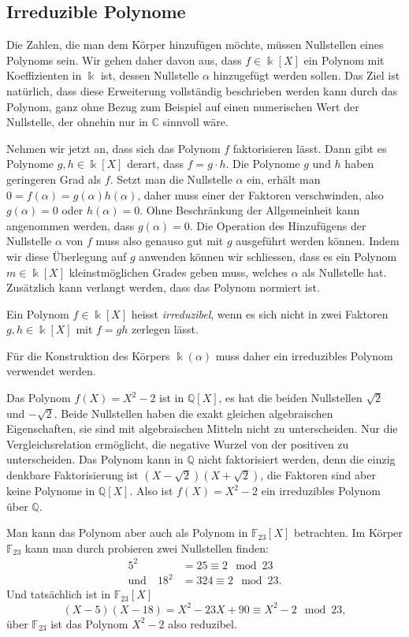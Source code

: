 \subsection{Irreduzible Polynome
\label{buch:subsection:irreduziblepolynome}}
Die Zahlen, die man dem Körper hinzufügen möchte, müssen Nullstellen
eines Polynoms sein.
Wir gehen daher davon aus, dass $f\in \Bbbk[X]$ ein Polynom mit
Koeffizienten in $\Bbbk$ ist, dessen Nullstelle $\alpha$ hinzugefügt
werden sollen.
Das Ziel ist natürlich, dass diese Erweiterung vollständig beschrieben
werden kann durch das Polynom, ganz ohne Bezug zum Beispiel auf einen
numerischen Wert der Nullstelle, der ohnehin nur in $\mathbb{C}$ sinnvoll
wäre.

Nehmen wir jetzt an, dass sich das Polynom $f$ faktorisieren lässt.
Dann gibt es Polynome $g,h\in\Bbbk[X]$ derart, dass $f=g\cdot h$.
Die Polynome $g$ und $h$ haben geringeren Grad als $f$. 
Setzt man die Nullstelle $\alpha$ ein, erhält man
$0=f(\alpha)=g(\alpha)h(\alpha)$, daher muss einer der Faktoren
verschwinden, also $g(\alpha)=0$ oder $h(\alpha)=0$.
Ohne Beschränkung der Allgemeinheit kann angenommen werden, dass
$g(\alpha)=0$.
Die Operation des Hinzufügens der Nullstelle $\alpha$ von $f$
muss also genauso gut mit $g$ ausgeführt werden können.
Indem wir diese Überlegung auf $g$ anwenden können wir schliessen,
dass es ein Polynom $m\in\Bbbk[X]$ kleinstmöglichen Grades geben muss,
welches $\alpha$ als Nullstelle hat.
Zusätzlich kann verlangt werden, dass das Polynom normiert ist.

\begin{definition}
Ein Polynom $f\in \Bbbk[X]$ heisst {\em irreduzibel}, wenn es sich nicht
in zwei Faktoren $g,h\in \Bbbk[X]$ mit $f=gh$ zerlegen lässt.
%
\end{definition}

Für die Konstruktion des Körpers $\Bbbk(\alpha)$ muss daher ein irreduzibles
Polynom verwendet werden.

\begin{beispiel}
Das Polynom $f(X)=X^2-2$ ist in $\mathbb{Q}[X]$, es hat die beiden
Nullstellen $\sqrt{2}$ und $-\sqrt{2}$.
Beide Nullstellen haben die exakt gleichen algebraischen Eigenschaften,
sie sind mit algebraischen Mitteln nicht zu unterscheiden.
Nur die Vergleichsrelation ermöglicht, die negative Wurzel von der
positiven zu unterscheiden.
Das Polynom kann in $\mathbb{Q}$ nicht faktorisiert werden, denn die
einzig denkbare Faktorisierung ist $(X-\sqrt{2})(X+\sqrt{2})$, die
Faktoren sind aber keine Polynome in $\mathbb{Q}[X]$.
Also ist $f(X) = X^2 - 2$ ein irreduzibles Polynom über $\mathbb Q$.

Man kann das Polynom aber auch als Polynom in $\mathbb{F}_{23}[X]$
betrachten.
Im Körper $\mathbb{F}_{23}$ kann man durch probieren zwei Nullstellen
finden:
\begin{align*}
5^2 &= 25\equiv 2\mod 23
\\
\text{und}\quad
18^2 &=324 \equiv 2 \mod 23.
\end{align*}
Und tatsächlich ist in $\mathbb{F}_{23}[X]$
\[
(X-5)(X-18) = X^2 -23X+90
\equiv
X^2 -2 \mod 23,
\]
über $\mathbb{F}_{23}$ ist das Polynom $X^2-2$ also reduzibel.
\end{beispiel}

